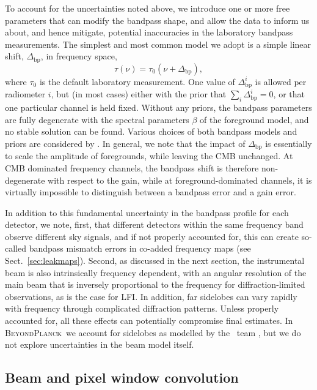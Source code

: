 \documentclass[onecolumn]{aa}
\newcommand{\BP}{\textsc{BeyondPlanck}}
\begin{document}
To account for the uncertainties noted above, we introduce one or more
free parameters that can modify the bandpass shape, and allow the data
to inform us about, and hence mitigate, potential inaccuracies in the
laboratory bandpass measurements. The simplest and most common model
we adopt is a simple linear shift, $\Delta_{\mathrm{bp}}$, in
frequency space,
\begin{equation}
  \tau(\nu) = \tau_0(\nu+\Delta_{\mathrm{bp}}),
  \label{eq:bp_shift}
\end{equation}
where $\tau_0$ is the default laboratory measurement. One value of
$\Delta_{\mathrm{bp}}^i$ is allowed per radiometer $i$, but (in most
cases) either with the prior that $\sum_i \Delta_{\mathrm{bp}}^i = 0$,
or that one particular channel is held fixed. Without any priors, the
bandpass parameters are fully degenerate with the spectral parameters
$\beta$ of the foreground model, and no stable solution can be
found. Various choices of both bandpass models and priors are
considered by \citet{bp09}. In general, we note that the impact of
$\Delta_{\mathrm{bp}}$ is essentially to scale the amplitude of
foregrounds, while leaving the CMB unchanged. At CMB dominated
frequency channels, the bandpass shift is therefore non-degenerate
with respect to the gain, while at foreground-dominated channels, it
is virtually impossible to distinguish between a bandpass error and a
gain error.

In addition to this fundamental uncertainty in the bandpass profile
for each detector, we note, first, that different detectors within the
same frequency band observe different sky signals, and if not properly
accounted for, this can create so-called bandpass mismatch errors in
co-added frequency maps (see Sect.~\ref{sec:leakmaps}). Second, as
discussed in the next section, the instrumental beam is also
intrinsically frequency dependent, with an angular resolution of the
main beam that is inversely proportional to the frequency for
diffraction-limited observations, as is the case for LFI.  In
addition, far sidelobes can vary rapidly with frequency through
complicated diffraction patterns. Unless properly accounted for, all
these effects can potentially compromise final estimates. In \BP\ we
account for sidelobes as modelled by the \Planck\ team
\citep{planck2014-a05}, but we do not explore uncertainties in the
beam model itself.

\subsection{Beam and pixel window convolution}
\label{sec:beam}
\end{document}

